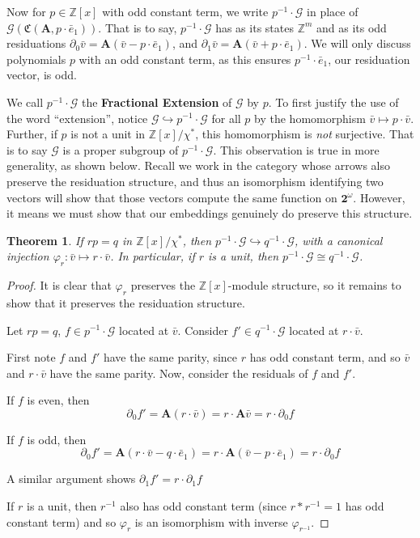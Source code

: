 \documentclass[runningheads]{llncs}
\newcommand{\G}{\mathcal{G}}
\newcommand{\Z}{\mathbb{Z}}
\newcommand{\2}{\textbf{2}}
\newcommand{\Am}{\textbf{A}}
\newcommand{\del}{\partial}
\newcommand{\vv}{\bar{v}}
\newcommand{\e}{\bar{e}}
\newtheorem{thm}{Theorem}
\begin{document}
Now for $p \in \Z[x]$ with odd constant term, we write
$p^{-1} \cdot \G$ in place of $\G(\mathfrak{C}(\Am, p \cdot \e_1))$.
That is to say, $p^{-1} \cdot \G$ has as its states $\Z^m$ and as its 
odd residuations
$\del_0 \vv = \Am (\vv - p \cdot \e_1)$, and 
$\del_1 \vv = \Am (\vv + p \cdot \e_1)$.
We will only discuss polynomials $p$ with an odd constant term, as 
this ensures $p^{-1} \cdot \e_1$, our residuation vector, is odd.

We call $p^{-1} \cdot \G$ the \textbf{Fractional Extension} of $\G$ by $p$.
To first justify the use of the word ``extension'', notice 
$\G \hookrightarrow p^{-1} \cdot \G$ for all $p$ by the
homomorphism $\vv \mapsto p \cdot \vv$. 
Further, if $p$ is not a unit in $\Z[x] / \chi^*$, this 
homomorphism is \emph{not} surjective. That is to say $\G$ is a proper 
subgroup of $p^{-1} \cdot \G$.
This observation is true in more generality, as shown below.
Recall we work in the category whose arrows also preserve the residuation
structure, and thus an isomorphism identifying two vectors will show that
those vectors compute the same function on $\2^\omega$. However, it means
we must show that our embeddings genuinely do preserve this structure.

\begin{thm}
  If $rp = q$ in $\Z[x] / \chi^*$, then 
  $p^{-1} \cdot \G \hookrightarrow q^{-1} \cdot \G$, 
  with a canonical injection $\varphi_r : \vv \mapsto r \cdot \vv$. 
  In particular, if $r$ is a unit, then $p^{-1} \cdot \G \cong q^{-1} \cdot \G$.
\end{thm}

\begin{proof}
  It is clear that $\varphi_r$ preserves the $\Z[x]$-module structure, so
  it remains to show that it preserves the residuation structure.

  Let $rp = q$, $f \in p^{-1} \cdot \G$ located at $\vv$. 
  Consider $f' \in q^{-1} \cdot \G$ located at $r \cdot \vv$.

  First note $f$ and $f'$ have the same parity, since 
  $r$ has odd constant term, and so $\vv$ and $r \cdot \vv$
  have the same parity. Now, consider the residuals of $f$ and $f'$. 
  
  If $f$ is even, then 
  \[ \del_0 f' = \Am (r \cdot \vv) = r \cdot \Am \vv = r \cdot \del_0 f \]

  If $f$ is odd, then
  \[ \del_0 f' = \Am (r \cdot \vv - q \cdot \e_1) 
               = r \cdot \Am (\vv - p \cdot \e_1)
               = r \cdot \del_0 f \]

  A similar argument shows $\del_1 f' = r \cdot \del_1 f$

  If $r$ is a unit, then $r^{-1}$ also has odd constant term 
  (since $r * r^{-1} = 1$ has odd constant term) and so $\varphi_r$
  is an isomorphism with inverse $\varphi_{r^{-1}}$.
\end{proof}
\end{document}

